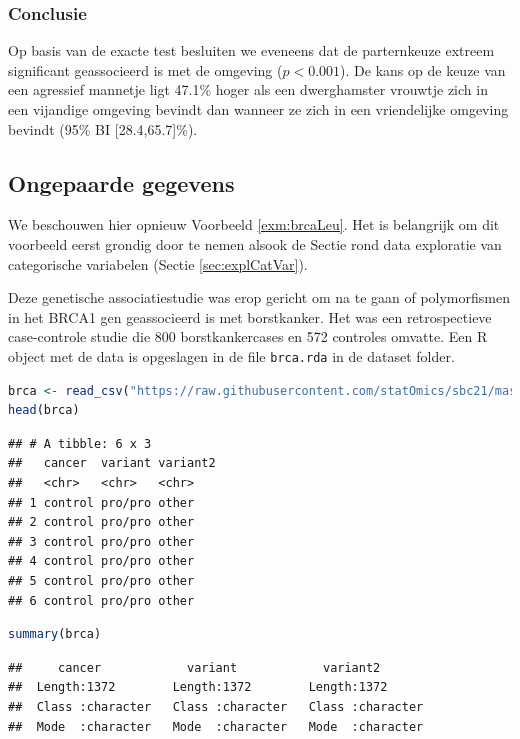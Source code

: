\documentclass[
  12pt,dutch,coursenotes]{book}
\newcommand{\passthrough}[1]{#1}
\theoremstyle{definition}
\theoremstyle{definition}
\theoremstyle{definition}
\theoremstyle{definition}
\theoremstyle{remark}
\begin{document}
\hypertarget{conclusie-1}{%
\subsubsection{Conclusie}\label{conclusie-1}}

Op basis van de exacte test besluiten we eveneens dat de parternkeuze extreem significant geassocieerd is met de omgeving (\(p<0.001\)).
De kans op de keuze van een agressief mannetje ligt 47.1\% hoger als een dwerghamster vrouwtje zich in een vijandige omgeving bevindt dan wanneer ze zich in een vriendelijke omgeving bevindt (95\% BI {[}28.4,65.7{]}\%).

\hypertarget{subsec:catOnPaired}{%
\subsection{Ongepaarde gegevens}\label{subsec:catOnPaired}}

We beschouwen hier opnieuw Voorbeeld \ref{exm:brcaLeu}.
Het is belangrijk om dit voorbeeld eerst grondig door te nemen alsook de Sectie rond data exploratie van categorische variabelen (Sectie \ref{sec:explCatVar}).

Deze genetische associatiestudie was erop gericht om na te gaan of polymorfismen in het BRCA1 gen geassocieerd is met borstkanker.
Het was een retrospectieve case-controle studie die 800 borstkankercases en 572 controles omvatte.
Een R object met de data is opgeslagen in de file \passthrough{\lstinline!brca.rda!} in de dataset folder.

\begin{lstlisting}[language=R]
brca <- read_csv("https://raw.githubusercontent.com/statOmics/sbc21/master/data/brca.csv")
head(brca)
\end{lstlisting}

\begin{lstlisting}
## # A tibble: 6 x 3
##   cancer  variant variant2
##   <chr>   <chr>   <chr>   
## 1 control pro/pro other   
## 2 control pro/pro other   
## 3 control pro/pro other   
## 4 control pro/pro other   
## 5 control pro/pro other   
## 6 control pro/pro other
\end{lstlisting}

\begin{lstlisting}[language=R]
summary(brca)
\end{lstlisting}

\begin{lstlisting}
##     cancer            variant            variant2        
##  Length:1372        Length:1372        Length:1372       
##  Class :character   Class :character   Class :character  
##  Mode  :character   Mode  :character   Mode  :character
\end{lstlisting}
\end{document}
